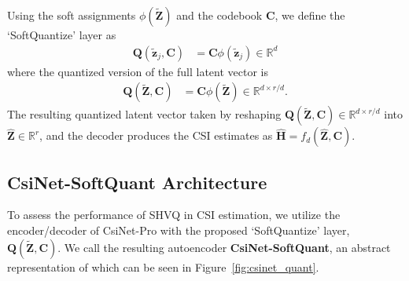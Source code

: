 Using the soft assignments $\phi(\tilde{\mathbf Z})$ and the codebook $\mathbf C$, we define the `SoftQuantize' layer as
\begin{align}
    \mathbf Q(\tilde{\mathbf z}_j,\mathbf C) &= \mathbf C \phi(\tilde{\mathbf z}_j) \in \mathbb R^d \label{eq:soft_quant}
\end{align}
where the quantized version of the full latent vector is 
\begin{align}
    \mathbf Q(\tilde{\mathbf Z},\mathbf C) &= \mathbf C \phi(\tilde{\mathbf Z}) \in \mathbb R^{d\times r/d}. \label{eq:soft_quant_mat}
\end{align}
The resulting quantized latent vector taken by reshaping $\mathbf Q(\tilde{\mathbf Z},\mathbf C) \in \mathbb R^{d \times r/d}$ into $\hat{\mathbf Z} \in \mathbb R^r$, and the decoder produces the CSI estimates as $\hat{\mathbf H} = f_d(\hat{\mathbf Z}, \mathbf C)$. %

\subsection{CsiNet-SoftQuant Architecture}

To assess the performance of SHVQ in CSI estimation, we utilize the encoder/decoder of CsiNet-Pro \cite{ref:liu2020sphnet} with the proposed `SoftQuantize' layer, $\mathbf Q(\tilde{\mathbf Z}, \mathbf C)$. We call the resulting autoencoder \textbf{CsiNet-SoftQuant}, an abstract representation of which can be seen in Figure~\ref{fig:csinet_quant}.

